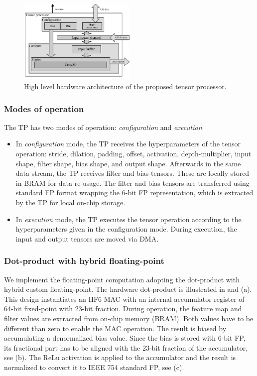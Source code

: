 \begin{figure}[t!]
	\centering
	\includegraphics[width=0.5\textwidth]{./chapters/cnn_accelerator/figures/accelerator.pdf}
	\caption{High level hardware architecture of the proposed tensor processor.}
	\label{fig:accelerator}
\end{figure}
\subsubsection{\textbf{Modes of operation}}
The TP has two modes of operation: \emph{configuration} and \emph{execution}.
\begin{itemize}
	\item In \emph{configuration} mode, the TP receives the hyperparameters of the tensor operation: stride, dilation, padding, offset, activation, depth-multiplier, input shape, filter shape, bias shape, and output shape. Afterwards in the same data stream, the TP receives filter and bias tensors. These are locally stored in BRAM for data re-usage. The filter and bias tensors are transferred using standard FP format wrapping the 6-bit FP representation, which is extracted by the TP for local on-chip storage.
	
	\item In \emph{execution} mode, the TP executes the tensor operation according to the hyperparameters given in the configuration mode. During execution, the input and output tensors are moved via DMA.
\end{itemize}
\subsubsection{\textbf{Dot-product with hybrid floating-point}}
\label{sec:dot_product}
We implement the floating-point computation adopting the dot-product with hybrid custom floating-point\cite{nevarez2021accelerating}. The hardware dot-product is illustrated in  and (a). This design instantiates an HF6 MAC with an internal accumulator register of 64-bit fixed-point with 23-bit fraction. During operation, the feature map and filter values are extracted from on-chip memory (BRAM). Both values have to be different than zero to enable the MAC operation. The result is biased by accumulating a denormalized bias value. Since the bias is stored with 6-bit FP, its fractional part has to be aligned with the 23-bit fraction of the accumulator, see (b). The ReLu activation is applied to the accumulator and the result is normalized to convert it to IEEE 754 standard FP, see (c).

